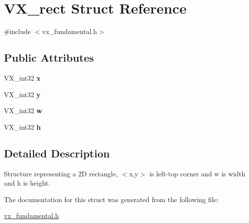 \hypertarget{structVX__rect}{\section{V\-X\-\_\-rect Struct Reference}
\label{structVX__rect}
}


{\ttfamily \#include $<$vx\-\_\-fundamental.\-h$>$}

\subsection*{Public Attributes}
\begin{DoxyCompactItemize}
\item 
\hypertarget{structVX__rect_a66eda219e63990bc6a0fb9b8e92a0d29}{V\-X\-\_\-int32 {\bfseries x}}\label{structVX__rect_a66eda219e63990bc6a0fb9b8e92a0d29}

\item 
\hypertarget{structVX__rect_a2153c6ab65197a6f5f836a07ec6d85f9}{V\-X\-\_\-int32 {\bfseries y}}\label{structVX__rect_a2153c6ab65197a6f5f836a07ec6d85f9}

\item 
\hypertarget{structVX__rect_a8d47c3a263b99ff61e33c736abee12cd}{V\-X\-\_\-int32 {\bfseries w}}\label{structVX__rect_a8d47c3a263b99ff61e33c736abee12cd}

\item 
\hypertarget{structVX__rect_abdb087a7dcb5c99bc47a347d9378355e}{V\-X\-\_\-int32 {\bfseries h}}\label{structVX__rect_abdb087a7dcb5c99bc47a347d9378355e}

\end{DoxyCompactItemize}


\subsection{Detailed Description}
Structure representing a 2\-D rectangle, $<$x,y$>$ is left-\/top corner and w is width and h is height. 

The documentation for this struct was generated from the following file\-:\begin{DoxyCompactItemize}
\item 
\hyperlink{vx__fundamental_8h}{vx\-\_\-fundamental.\-h}\end{DoxyCompactItemize}
